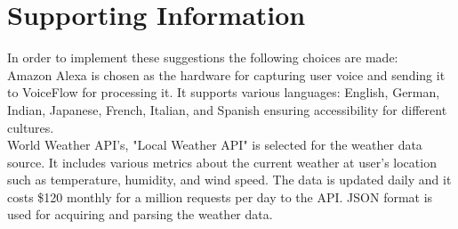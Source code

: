 \section{Supporting Information}
In order to implement these suggestions the following choices are made: \\
Amazon Alexa is chosen as the hardware for capturing user voice and sending it to VoiceFlow for processing it. It supports various languages: English, German, Indian, Japanese, French, Italian, and Spanish ensuring accessibility for different cultures. \\
World Weather API's, "Local Weather API" is selected for the weather data source. It includes various metrics about the current weather at user's location such as temperature, humidity, and wind speed. The data is updated daily and it costs \$120 monthly for a million requests per day to the API. JSON format is used for acquiring and parsing the weather data.